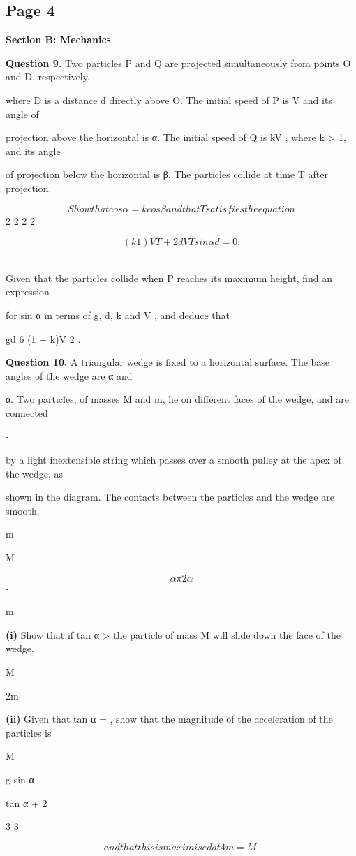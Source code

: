 \documentclass[12pt]{article}
\begin{document}
\subsection*{Page 4}
\begin{flushleft}
\bigskip\textbf{Section B: Mechanics}\par
\bigskip\textbf{Question 9.} Two particles P and Q are projected simultaneously from points O and D, respectively,\par
where D is a distance d directly above O. The initial speed of P is V and its angle of\par
projection above the horizontal is α. The initial speed of Q is kV , where k > 1, and its angle\par
of projection below the horizontal is β. The particles collide at time T after projection.\par
\[Show that cos α = k cos β and that T satisfies the equation\]
2 2 2 2\par
\[(k 1)V T + 2dV T sin α d = 0 .\]
- -\par
Given that the particles collide when P reaches its maximum height, find an expression\par
for sin α in terms of g, d, k and V , and deduce that\par
gd 6 (1 + k)V 2 .\par
\bigskip\textbf{Question 10.} A triangular wedge is fixed to a horizontal surface. The base angles of the wedge are α and\par
\pi α. Two particles, of masses M and m, lie on different faces of the wedge, and are connected\par
-\par
by a light inextensible string which passes over a smooth pulley at the apex of the wedge, as\par
shown in the diagram. The contacts between the particles and the wedge are smooth.\par
m\par
M\par
\[α \pi 2 α\]
-\par
m\par
\textbf{(i)} Show that if tan α > the particle of mass M will slide down the face of the wedge.\par
M\par
2m\par
\textbf{(ii)} Given that tan α = , show that the magnitude of the acceleration of the particles is\par
M\par
g sin α\par
tan α + 2\par
3 3\par
\[and that this is maximised at 4m = M .\]
\end{flushleft}
\end{document}

